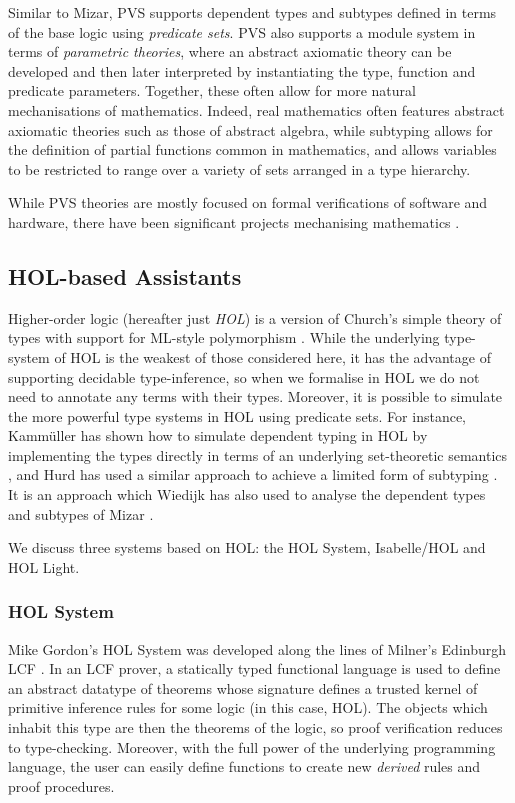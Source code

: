 Similar to Mizar, PVS supports dependent types and subtypes defined in terms of the base logic using \emph{predicate sets}. PVS also supports a module system in terms of \emph{parametric theories}, where an abstract axiomatic theory can be developed and then later interpreted by instantiating the type, function and predicate parameters. Together, these often allow for more natural mechanisations of mathematics. Indeed, real mathematics often features abstract axiomatic theories such as those of abstract algebra, while subtyping allows for the definition of partial functions common in mathematics, and allows variables to be restricted to range over a variety of sets arranged in a type hierarchy. 

While PVS theories are mostly focused on formal verifications of software and hardware, there have been significant projects mechanising mathematics \cite{IntegralCalculusPVS}.

\subsection{HOL-based Assistants}
Higher-order logic (hereafter just \emph{HOL}) is a version of Church's simple theory of types with support for ML-style polymorphism \cite{ChurchTheoryOfTypes}. While the underlying type-system of HOL is the weakest of those considered here, it has the advantage of supporting decidable type-inference, so when we formalise in HOL we do not need to annotate any terms with their types. Moreover, it is possible to simulate the more powerful type systems in HOL using predicate sets. For instance, Kamm\"{u}ller has shown how to simulate dependent typing in HOL by implementing the types directly in terms of an underlying set-theoretic semantics \cite{KammullerDependent}, and Hurd has used a similar approach to achieve a limited form of subtyping \cite{HurdSubtyping}\label{predicatesubtyping}. It is an approach which Wiedijk has also used to analyse the dependent types and subtypes of Mizar \cite{MizarSoftTypes}.

We discuss three systems based on HOL: the HOL System, Isabelle/HOL and HOL Light.

\subsubsection{HOL System}
Mike Gordon's HOL System was developed along the lines of Milner's Edinburgh LCF \cite{LCF, LCFtoHOL}. In an LCF prover, a statically typed functional language is used to define an abstract datatype of theorems whose signature defines a trusted kernel of primitive inference rules for some logic (in this case, HOL). The objects which inhabit this type are then the theorems of the logic, so proof verification reduces to type-checking. Moreover, with the full power of the underlying programming language, the user can easily define functions to create new \emph{derived} rules and proof procedures. 

